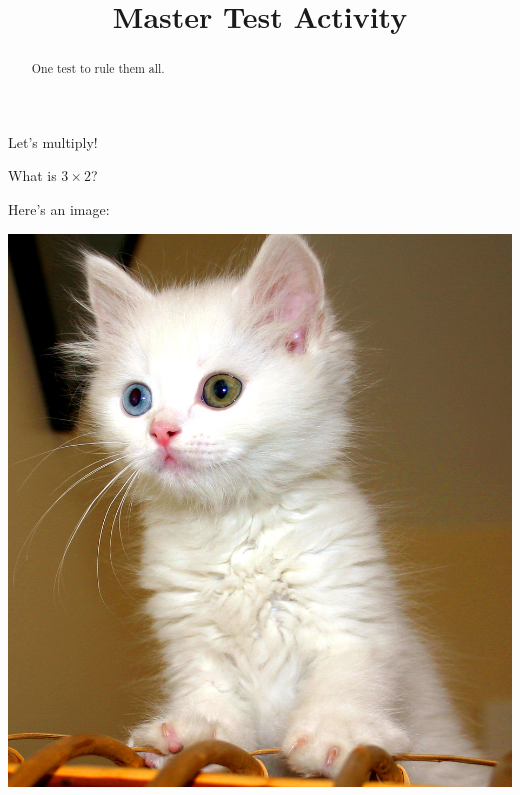 \documentclass[handout]{ximera}
\title{Master Test Activity}
\begin{document}
\begin{abstract}
  One test to rule them all.
\end{abstract}

Let's multiply!
\begin{question}
	What is $3 \times 2$?  
\end{question}

Here's an image:
\begin{image}
	\includegraphics[scale=.1]{testCat.jpg}
\end{image}
\end{document}
